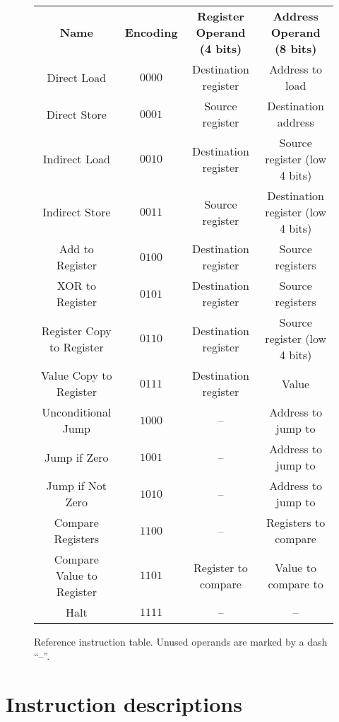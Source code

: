 \documentclass[11pt]{article}
\begin{document}
\begin{figure}[h]
  \centering
  \begin{tabular}{c c c c}
    \textbf{Name} & \textbf{Encoding} &
    \textbf{Register Operand (4 bits)} & \textbf{Address Operand (8 bits)} \\
    Direct Load & 
    $0000$ & Destination register & Address to load \\
    Direct Store &
    $0001$ & Source register & Destination address \\
    Indirect Load &
    $0010$ & Destination register & Source register (low 4 bits) \\
    Indirect Store &
    $0011$ & Source register & Destination register (low 4 bits) \\
    Add to Register  & 
    $0100$ & Destination register & Source registers \\
    XOR to Register &
    $0101$ & Destination register & Source registers \\
    Register Copy to Register &
    $0110$ & Destination register & Source register (low 4 bits) \\
    Value Copy to Register &
    $0111$ & Destination register & Value \\
    Unconditional Jump &
    $1000$ & -- & Address to jump to \\
    Jump if Zero &
    $1001$ & -- & Address to jump to \\
    Jump if Not Zero &
    $1010$ & -- & Address to jump to \\
    Compare Registers &
    $1100$ & -- & Registers to compare \\
    Compare Value to Register &
    $1101$ & Register to compare & Value to compare to \\
    Halt &
    $1111$ & -- & --
  \end{tabular}
  \caption{%
    Reference instruction table. Unused operands are marked by a dash ``--''.
  }
\end{figure}

\newpage

\section*{Instruction descriptions}
\end{document}
